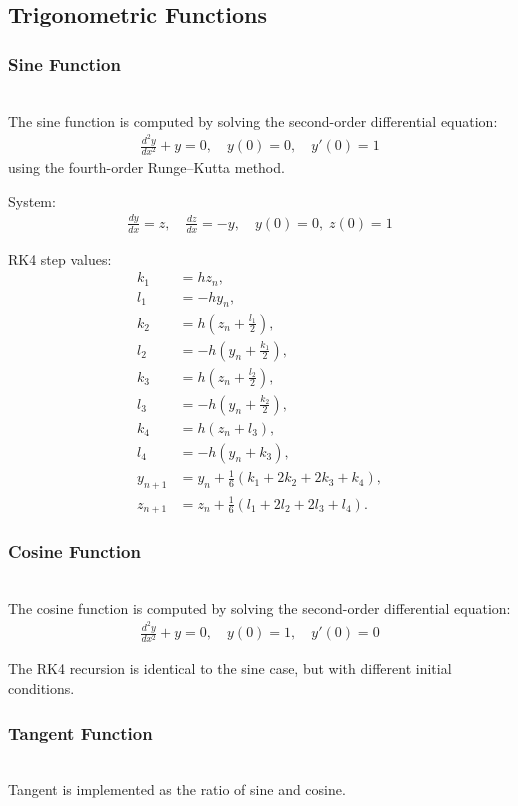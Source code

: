 \documentclass[conference]{IEEEtran}
\begin{document}
\subsection{Trigonometric Functions}

\subsubsection{Sine Function} \\
The sine function \cite{ncert12} is computed by solving the second-order differential equation:
\begin{align}
\frac{d^2y}{dx^2} + y = 0, \quad y(0)=0, \quad y'(0)=1
\end{align}
using the fourth-order Runge--Kutta method.

System:
\begin{align}
\frac{dy}{dx}=z, \quad \frac{dz}{dx}=-y, \quad y(0)=0, \; z(0)=1
\end{align}

RK4 step values:
\begin{align}
k_1 &= h z_n, \\
l_1 &= -h y_n, \\
k_2 &= h \left(z_n+\tfrac{l_1}{2}\right), \\
l_2 &= -h \left(y_n+\tfrac{k_1}{2}\right), \\
k_3 &= h \left(z_n+\tfrac{l_2}{2}\right), \\
l_3 &= -h \left(y_n+\tfrac{k_2}{2}\right), \\
k_4 &= h(z_n+l_3), \\
l_4 &= -h(y_n+k_3), \\
y_{n+1} &= y_n+\frac{1}{6}(k_1+2k_2+2k_3+k_4), \\
z_{n+1} &= z_n+\tfrac{1}{6}(l_1+2l_2+2l_3+l_4).
\end{align}

\subsubsection{Cosine Function} \\
The cosine function \cite{ncert12} is computed by solving the second-order differential equation:
\begin{align}
\frac{d^2y}{dx^2} + y = 0, \quad y(0)=1, \quad y'(0)=0
\end{align}

The RK4 recursion is identical to the sine case, but with different initial conditions.


\subsubsection{Tangent Function} \\
Tangent \cite{ncert12} is implemented as the ratio of sine and cosine.
\end{document}

